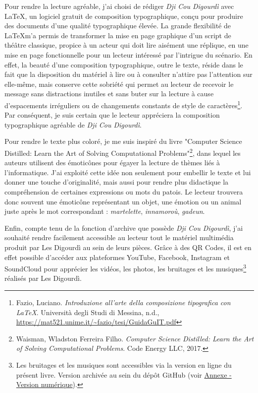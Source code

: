 Pour rendre la lecture agréable, j'ai choisi de rédiger \textit{Dji Cou Digourdì} avec \LaTeX, un logiciel gratuit de composition typographique, conçu pour produire des documents d'une qualité typographique élevée. La grande flexibilité de \LaTeX m'a permis de transformer la mise en page graphique d'un script de théâtre classique, propice à un acteur qui doit lire aisément une réplique, en une mise en page fonctionnelle pour un lecteur intéressé par l'intrigue du scénario. En effet, la beauté d'une composition typographique, outre le texte, réside dans le fait que la disposition du matériel à lire ou à consulter n'attire pas l'attention sur elle-même, mais conserve cette sobriété qui permet au lecteur de recevoir le message sans distractions inutiles et sans buter sur la lecture à cause d'espacements irréguliers ou de changements constants de style de caractères\footnote{ Fazio, Luciano. \textit{Introduzione all'arte della composizione tipografica con LaTeX}. Università degli Studi di Messina, n.d., \url{https://mat521.unime.it/~fazio/tesi/GuidaGuIT.pdf}}. Par conséquent, je suis certain que le lecteur appréciera la composition typographique agréable de \textit{Dji Cou Digourdì}.

Pour rendre le texte plus coloré, je me suis inspiré du livre "Computer Science Distilled: Learn the Art of Solving Computational Problems"\footnote{ Waisman, Wladston Ferreira Filho. \textit{Computer Science Distilled: Learn the Art of Solving Computational Problems}. Code Energy LLC, 2017.}, dans lequel les auteurs utilisent des émoticônes pour égayer la lecture de thèmes liés à l'informatique. J'ai exploité cette idée non seulement pour embellir le texte et lui donner une touche d'originalité, mais aussi pour rendre plus didactique la compréhension de certaines expressions ou mots du patois. Le lecteur trouvera donc souvent une émoticône représentant un objet, une émotion ou un animal juste après le mot correspondant : \textit{martelette}\martello, \textit{innamoroù}\inamourou, \textit{gadeun}\gadeun.

Enfin, compte tenu de la fonction d'archive que possède \textit{Dji Cou Digourdì}, j'ai souhaité rendre facilement accessible au lecteur tout le matériel multimédia produit par Les Digourdì au sein de leurs pièces. Grâce à des QR Codes, il est en effet possible d'accéder aux plateformes YouTube, Facebook, Instagram et SoundCloud pour apprécier les vidéos, les photos, les bruitages et les musiques\footnote{ Les bruitages et les musiques sont accessibles via la version en ligne du présent livre. Version archivée au sein du dépôt GitHub (voir \hyperref[vers_num]{Annexe - Version numérique}).} réalisés par Les Digourdì.

